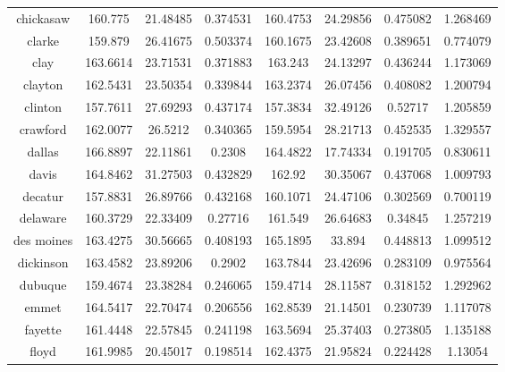 \begin{table}[H]
\begin{tabular}{|c|ccc|ccc|c|}
chickasaw     & 160.775  & 21.48485       & 0.374531 & 160.4753 & 24.29856       & 0.475082 & 1.268469 \\
clarke        & 159.879  & 26.41675       & 0.503374 & 160.1675 & 23.42608       & 0.389651 & 0.774079 \\
clay          & 163.6614 & 23.71531       & 0.371883 & 163.243  & 24.13297       & 0.436244 & 1.173069 \\
clayton       & 162.5431 & 23.50354       & 0.339844 & 163.2374 & 26.07456       & 0.408082 & 1.200794 \\
clinton       & 157.7611 & 27.69293       & 0.437174 & 157.3834 & 32.49126       & 0.52717  & 1.205859 \\
crawford      & 162.0077 & 26.5212        & 0.340365 & 159.5954 & 28.21713       & 0.452535 & 1.329557 \\
dallas        & 166.8897 & 22.11861       & 0.2308   & 164.4822 & 17.74334       & 0.191705 & 0.830611 \\
davis         & 164.8462 & 31.27503       & 0.432829 & 162.92   & 30.35067       & 0.437068 & 1.009793 \\
decatur       & 157.8831 & 26.89766       & 0.432168 & 160.1071 & 24.47106       & 0.302569 & 0.700119 \\
delaware      & 160.3729 & 22.33409       & 0.27716  & 161.549  & 26.64683       & 0.34845  & 1.257219 \\
des moines    & 163.4275 & 30.56665       & 0.408193 & 165.1895 & 33.894         & 0.448813 & 1.099512 \\
dickinson     & 163.4582 & 23.89206       & 0.2902   & 163.7844 & 23.42696       & 0.283109 & 0.975564 \\
dubuque       & 159.4674 & 23.38284       & 0.246065 & 159.4714 & 28.11587       & 0.318152 & 1.292962 \\
emmet         & 164.5417 & 22.70474       & 0.206556 & 162.8539 & 21.14501       & 0.230739 & 1.117078 \\
fayette       & 161.4448 & 22.57845       & 0.241198 & 163.5694 & 25.37403       & 0.273805 & 1.135188 \\
floyd         & 161.9985 & 20.45017       & 0.198514 & 162.4375 & 21.95824       & 0.224428 & 1.13054  


\\
\hline
\end{tabular}
\end{table}

